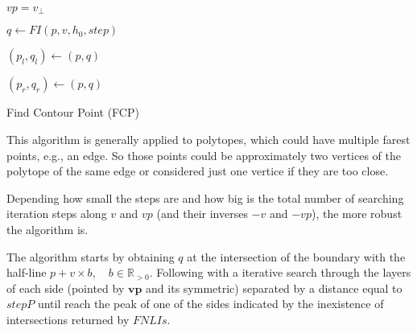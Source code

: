   \begin{algorithm}

    $vp = v_{\perp}$

    $q \gets FI(p, v, h_0, step)$  

    $(p_l, q_l) \gets (p, q)$ 
     
    $(p_r, q_r) \gets (p, q)$  

    
    \caption{Find Contour Point (FCP)} \label{alg:Find_Contour_Point}
  \end{algorithm}

This algorithm is generally applied to polytopes, which could have multiple farest points, e.g., an edge. So those points could be approximately two vertices of the polytope of the same edge or considered just one vertice if they are too close. \par
Depending how small the steps are and how big is the total number of searching iteration steps along \(v\) and \(vp\) (and their inverses \(-v\) and \(-vp\)), the more robust the algorithm  is.\par
The algorithm starts by obtaining \(q\) at the intersection of the boundary with the half-line \(p + v\times b, \quad b \in \mathbb{R}_{>0}\). Following with a iterative  search through the layers of each side (pointed by \(\mathbf{vp}\) and its symmetric) separated by a distance equal to \(stepP\) until reach the peak of one of the sides indicated by the inexistence of intersections returned by \(FNLIs\).\\


